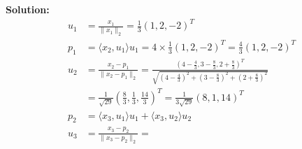 \documentclass{article}
\begin{document}
\vspace{0.5cm}
\noindent\textbf{Solution:}
\begin{align*}
    u_1 &= \frac{x_1}{\|x_1\|_2} = \frac{1}{3} (1, 2, -2)^T \\
    p_1 &= \langle x_2, u_1 \rangle u_1 = 4 \times \frac{1}{3} (1, 2, -2)^T = \frac{4}{3} (1, 2, -2)^T \\
    u_2 &= \frac{x_2 - p_1}{\|x_2 - p_1\|_2} = \frac{(4 - \frac{4}{3}, 3 - \frac{8}{3}, 2 + \frac{8}{3})^T}{\sqrt{(4 - \frac{4}{3})^2 + (3 - \frac{8}{3})^2 + (2 + \frac{8}{3})^2}} \\
    &= \frac{1}{\sqrt{29}} \left(\frac{8}{3}, \frac{1}{3}, \frac{14}{3}\right)^T = \frac{1}{3 \sqrt{29}} (8, 1, 14)^T \\
    p_2 &= \langle x_3, u_1 \rangle u_1 + \langle x_3, u_2 \rangle u_2 \\
    u_3 &= \frac{x_3 - p_2}{\|x_3 - p_2\|_2} = 
\end{align*}
\end{document}
